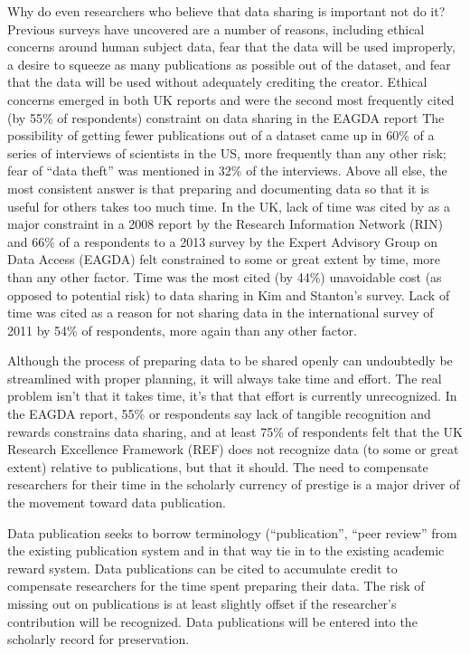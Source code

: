 \documentclass[10pt]{article}
\begin{document}
Why do even researchers who believe that data sharing is important not do it?
Previous surveys have uncovered are a number of reasons, including ethical concerns around human subject data, fear that the data will be used improperly, a desire to squeeze as many publications as possible out of the dataset, and fear that the data will be used without adequately crediting the creator.
Ethical concerns emerged in both UK reports and were the second most frequently cited (by 55\% of respondents) constraint on data sharing in the EAGDA report\cite{swann_share_2008, bobrow_establishing_2014}
The possibility of getting fewer publications out of a dataset came up in 60\% of a series of interviews of scientists in the US, more frequently than any other risk; fear of ``data theft'' was mentioned in 32\% of the interviews\cite{kim_institutional_2012}.
Above all else, the most consistent answer is that preparing and documenting data so that it is useful for others takes too much time.
In the UK, lack of time was cited by as a major constraint in a 2008 report by the Research Information Network (RIN)\cite{swan_share_2008} and 66\% of a respondents to a 2013 survey by the Expert Advisory Group on Data Access (EAGDA) felt constrained to some or great extent by time, more than any other factor\cite{bobrow_establishing_2014}.
Time was the most cited (by 44\%) unavoidable cost (as opposed to potential risk) to data sharing in Kim and Stanton's survey\cite{kim_institutional_2012}.
Lack of time was cited as a reason for not sharing data in the international survey of 2011 by 54\% of respondents, more again than any other factor\cite{tenopi_data_2011}.

Although the process of preparing data to be shared openly can undoubtedly be streamlined with proper planning, it will always take time and effort.
The real problem isn't that it takes time, it's that that effort is currently unrecognized.
In the EAGDA report, 55\% or respondents say lack of tangible recognition and rewards constrains data sharing, and at least 75\% of respondents felt that the UK Research Excellence Framework (REF) does not recognize data (to some or great extent) relative to publications, but that it should.
The need to compensate researchers for their time in the scholarly currency of prestige is a major driver of the movement toward data publication.
 
Data publication seeks to borrow terminology (``publication'', ``peer review'' from the existing publication system and in that way tie in to the existing academic reward system\cite{costello_motivating_2009, lawrence_data_2011}.
Data publications can be cited to accumulate credit to compensate researchers for the time spent preparing their data. 
The risk of missing out on publications is at least slightly offset if the researcher's contribution will be recognized.
Data publications will be entered into the scholarly record for preservation.
\end{document}
